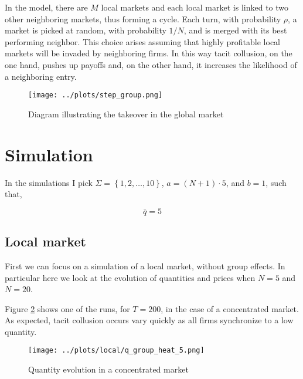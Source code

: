 \documentclass[american]{scrartcl}
\newcommand{\set}[1]{\left\{#1\right\}}
\begin{document}
In the model, there are $M$ local markets and each local market is linked to two other neighboring markets, thus forming a cycle. Each turn, with probability $\rho$, a market is picked at random, with probability $1 / N$, and is merged with its best performing neighbor. This choice arises assuming that highly profitable local markets will be invaded by neighboring firms. In this way tacit collusion, on the one hand, pushes up payoffs and, on the other hand, it increases the likelihood of a neighboring entry.



\begin{center}
    \begin{figure}[H]
        \center
        \texttt{[image: ../plots/step\_group.png]}
        \caption{Diagram illustrating the takeover in the global market}
        \label{fig:diagram}
    \end{figure}
\end{center}


\section{Simulation}

In the simulations I pick $\Sigma = \set{1, 2, \ldots, 10}$, $a = (N + 1) \cdot 5$, and $b = 1$, such that,

\begin{equation}
    \bar{q} = 5
\end{equation}

\subsection{Local market}

First we can focus on a simulation of a local market, without group effects. In particular here we look at the evolution of quantities and prices when $N = 5$ and $N = 20$.

Figure \ref{fig:small_local} shows one of the runs, for $T = 200$, in the case of a concentrated market. As expected, tacit collusion occurs vary quickly as all firms synchronize to a low quantity.

\begin{center}
    \begin{figure}[H]
        \center
        \texttt{[image: ../plots/local/q\_group\_heat\_5.png]}
        \caption{Quantity evolution in a concentrated market}
        \label{fig:small_local}
    \end{figure}
\end{center}
\end{document}
